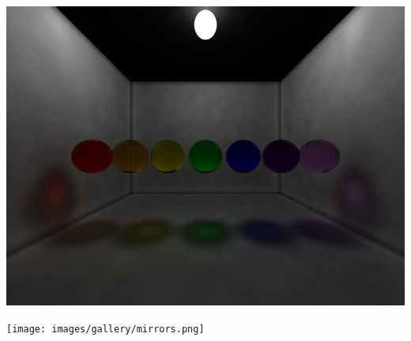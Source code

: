 \documentclass[a4paper]{article}
\begin{document}
\begin{center}
	\includegraphics[scale=0.43]{images/gallery/rainbow.png}
	\label{fig:rainbow}
\end{center}

\begin{center}
	\texttt{[image: images/gallery/mirrors.png]}
	\label{fig:mirrors}
\end{center}
\end{document}
